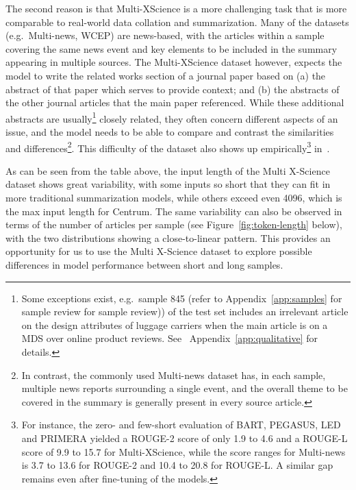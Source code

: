 \documentclass[12pt, twocolumn]{article}
\numberwithin{equation}{section}
\begin{document}
The second reason is that Multi-XScience is a more challenging task that is more comparable to real-world data collation and summarization.   Many of the datasets (e.g.~Multi-news, WCEP) are news-based, with the articles within a sample covering the same news event and key elements to be included in the summary appearing in multiple sources.  The Multi-XScience dataset however, expects the model to write the related works section of a journal paper based on (a) the abstract of that paper which serves to provide context; and (b) the abstracts of the other journal articles that the main paper referenced.  While these additional abstracts are usually\footnote{Some exceptions exist, e.g.~sample 845 (refer to Appendix~\ref{app:samples} for sample review for sample review)) of the test set includes an irrelevant article on the design attributes of luggage carriers when the main article is on a MDS over online product reviews.  See ~Appendix~\ref{app:qualitative} for details.} closely related, they often concern different aspects of an issue, and the model needs to be able to compare and contrast the similarities and differences\footnote{In contrast, the commonly used Multi-news dataset has, in each sample, multiple news reports surrounding a single event, and the overall theme to be covered in the summary is generally present in every source article.}.  This difficulty of the dataset also shows up empirically\footnote{For instance, the zero- and few-short evaluation of BART, PEGASUS, LED and PRIMERA yielded a ROUGE-2 score of only 1.9 to 4.6 and a ROUGE-L score of 9.9 to 15.7 for Multi-XScience, while the score ranges for Multi-news is 3.7 to 13.6 for ROUGE-2 and 10.4 to 20.8 for ROUGE-L.  A similar gap remains even after fine-tuning of the models.} in~\cite{xiao2022primera}.

As can be seen from the table above, the input length of the Multi X-Science dataset shows great variability, with some inputs so short that they can fit in more traditional summarization models, while others exceed even 4096, which is the max input length for Centrum.  The same variability can also be observed in terms of the number of articles per sample (see Figure~\ref{fig:token-length} below), with the two distributions showing a close-to-linear pattern.  This provides an opportunity for us to use the Multi X-Science dataset to explore possible differences in model performance between short and long samples. 
\end{document}
